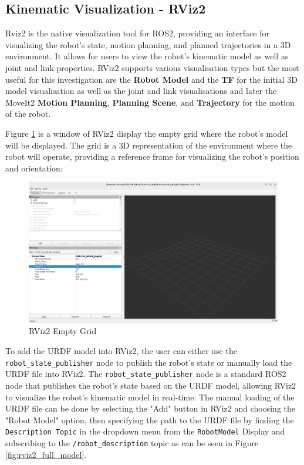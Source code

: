 \documentclass[10pt,a4paper,english]{article}
\begin{document}
\subsection{Kinematic Visualization - RViz2}
Rviz2 is the native visualization tool for ROS2, providing an interface for visualizing the robot's state, motion planning, and planned trajectories in a 3D environment. It allows for users to view the robot's kinematic model as well as joint and link properties. RViz2 supports various visualisation types but the most useful for this investigation are the \textbf{Robot Model} and the \textbf{TF} for the initial 3D model visualisation as well as the joint and link visualisations and later the MoveIt2 \textbf{Motion Planning}, \textbf{Planning Scene}, and \textbf{Trajectory} for the motion of the robot.

Figure \ref{fig:rviz2_empty_grid} is a window of RViz2 display the empty grid where the robot's model will be displayed. The grid is a 3D representation of the environment where the robot will operate, providing a reference frame for visualizing the robot's position and orientation:
\begin{figure}[ht]
    \centering
    \includegraphics[width=1.0\textwidth]{RViz_Empty.png}
    \caption{RViz2 Empty Grid}
    \label{fig:rviz2_empty_grid}
\end{figure}

To add the URDF model into RViz2, the user can either use the \texttt{robot\_state\_publisher} node to publish the robot's state or manually load the URDF file into RViz2. The \texttt{robot\_state\_publisher} node is a standard ROS2 node that publishes the robot's state based on the URDF model, allowing RViz2 to visualize the robot's kinematic model in real-time. The manual loading of the URDF file can be done by selecting the "Add" button in RViz2 and choosing the "Robot Model" option, then specifying the path to the URDF file by finding the \texttt{Description Topic} in the dropdown menu from the \texttt{RobotModel} Display and subscribing to the \texttt{/robot\_description} topic as can be seen in Figure \ref{fig:rviz2_full_model}. \par
\end{document}
